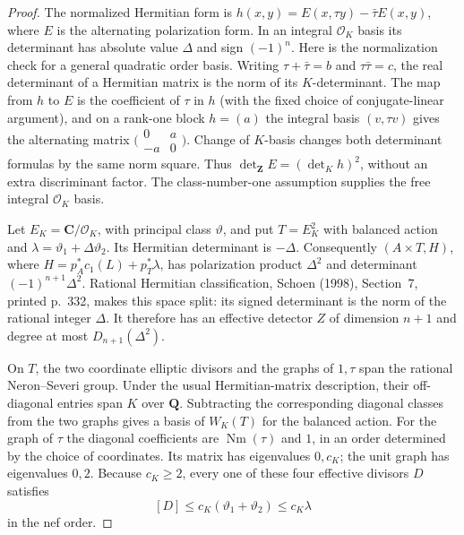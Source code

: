 \begin{proof}
The normalized Hermitian form is
$h(x,y)=E(x,\tau y)-\bar\tau E(x,y)$, where $E$ is the alternating
polarization form. In an integral $\mathcal O_K$ basis its determinant
has absolute value $\Delta$ and sign $(-1)^n$.
Here is the normalization check for a general quadratic order basis.
Writing $\tau+\bar\tau=b$ and $\tau\bar\tau=c$, the real determinant
of a Hermitian matrix is the norm of its $K$-determinant. The map from
$h$ to $E$ is the coefficient of $\tau$ in $h$ (with the fixed choice
of conjugate-linear argument), and on a rank-one block $h=(a)$ the
integral basis $(v,\tau v)$ gives the alternating matrix
$\bigl(\begin{smallmatrix}0&a\\-a&0\end{smallmatrix}\bigr)$.
Change of $K$-basis changes both determinant formulas by the same
norm square. Thus $\det_{\mathbf Z}E=(\det_K h)^2$, without an
extra discriminant factor. The class-number-one assumption supplies
the free integral $\mathcal O_K$ basis.

Let $E_K=\mathbf C/\mathcal O_K$, with principal class $\vartheta$,
and put $T=E_K^2$ with balanced action and
$\lambda=\vartheta_1+\Delta\vartheta_2$. Its Hermitian determinant
is $-\Delta$. Consequently $(A\times T,H)$, where
$H=p_A^*c_1(L)+p_T^*\lambda$, has polarization product $\Delta^2$
and determinant $(-1)^{n+1}\Delta^2$. Rational Hermitian
classification, Schoen (1998), Section~7, printed p.~332, makes this
space split: its signed determinant is the norm of the rational
integer $\Delta$. It therefore has an effective detector $Z$ of
dimension $n+1$ and degree at most $D_{n+1}(\Delta^2)$.

On $T$, the two coordinate elliptic divisors and the graphs of
$1,\tau$ span the rational Neron--Severi group. Under the usual
Hermitian-matrix description, their off-diagonal entries span $K$
over $\mathbf Q$. Subtracting the corresponding diagonal classes
from the two graphs gives a basis of $W_K(T)$ for the balanced
action. For the graph of $\tau$ the diagonal coefficients are
$\operatorname{Nm}(\tau)$ and $1$, in an order determined by the
choice of coordinates. Its matrix has eigenvalues $0,c_K$; the
unit graph has eigenvalues $0,2$. Because $c_K\ge2$, every one of
these four effective divisors $D$ satisfies
\[
 [D]\le c_K(\vartheta_1+\vartheta_2)\le c_K\lambda
\]
in the nef order.


\end{proof}
